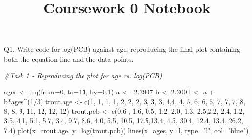 \documentclass[
]{article}
\title{Coursework 0 Notebook}
\author{}
\date{\vspace{-2.5em}}
\newenvironment{Shaded}{\begin{snugshade}}{\end{snugshade}}
\newcommand{\AttributeTok}[1]{\textcolor[rgb]{0.77,0.63,0.00}{#1}}
\newcommand{\CommentTok}[1]{\textcolor[rgb]{0.56,0.35,0.01}{\textit{#1}}}
\newcommand{\DecValTok}[1]{\textcolor[rgb]{0.00,0.00,0.81}{#1}}
\newcommand{\FloatTok}[1]{\textcolor[rgb]{0.00,0.00,0.81}{#1}}
\newcommand{\FunctionTok}[1]{\textcolor[rgb]{0.00,0.00,0.00}{#1}}
\newcommand{\NormalTok}[1]{#1}
\newcommand{\OtherTok}[1]{\textcolor[rgb]{0.56,0.35,0.01}{#1}}
\newcommand{\SpecialCharTok}[1]{\textcolor[rgb]{0.00,0.00,0.00}{#1}}
\newcommand{\StringTok}[1]{\textcolor[rgb]{0.31,0.60,0.02}{#1}}
\begin{document}
\maketitle

Q1. Write code for log(PCB) against age, reproducing the final plot
containing both the equation line and the data points.

\begin{Shaded}
\begin{Highlighting}[]
\CommentTok{\#Task 1 {-} Reproducing the plot for age vs. log(PCB)}


\NormalTok{ages }\OtherTok{\textless{}{-}} \FunctionTok{seq}\NormalTok{(}\AttributeTok{from=}\DecValTok{0}\NormalTok{, }\AttributeTok{to=}\DecValTok{13}\NormalTok{, }\AttributeTok{by=}\FloatTok{0.1}\NormalTok{)}
\NormalTok{a }\OtherTok{\textless{}{-}} \SpecialCharTok{{-}}\FloatTok{2.3907}
\NormalTok{b }\OtherTok{\textless{}{-}} \FloatTok{2.300}
\NormalTok{l }\OtherTok{\textless{}{-}}\NormalTok{ a }\SpecialCharTok{+}\NormalTok{ b}\SpecialCharTok{*}\NormalTok{ages}\SpecialCharTok{\^{}}\NormalTok{(}\DecValTok{1}\SpecialCharTok{/}\DecValTok{3}\NormalTok{)}
\NormalTok{trout.age }\OtherTok{\textless{}{-}} \FunctionTok{c}\NormalTok{(}\DecValTok{1}\NormalTok{, }\DecValTok{1}\NormalTok{, }\DecValTok{1}\NormalTok{, }\DecValTok{1}\NormalTok{, }\DecValTok{2}\NormalTok{, }\DecValTok{2}\NormalTok{, }\DecValTok{2}\NormalTok{, }\DecValTok{3}\NormalTok{, }\DecValTok{3}\NormalTok{, }\DecValTok{3}\NormalTok{, }\DecValTok{4}\NormalTok{,}\DecValTok{4}\NormalTok{, }\DecValTok{4}\NormalTok{, }\DecValTok{5}\NormalTok{, }\DecValTok{6}\NormalTok{, }\DecValTok{6}\NormalTok{, }\DecValTok{6}\NormalTok{, }\DecValTok{7}\NormalTok{, }\DecValTok{7}\NormalTok{, }\DecValTok{7}\NormalTok{, }\DecValTok{8}\NormalTok{, }\DecValTok{8}\NormalTok{,}
               \DecValTok{8}\NormalTok{, }\DecValTok{9}\NormalTok{, }\DecValTok{11}\NormalTok{, }\DecValTok{12}\NormalTok{, }\DecValTok{12}\NormalTok{, }\DecValTok{12}\NormalTok{)}
\NormalTok{trout.pcb }\OtherTok{\textless{}{-}} \FunctionTok{c}\NormalTok{(}\FloatTok{0.6}\NormalTok{ , }\FloatTok{1.6}\NormalTok{, }\FloatTok{0.5}\NormalTok{, }\FloatTok{1.2}\NormalTok{, }\FloatTok{2.0}\NormalTok{, }\FloatTok{1.3}\NormalTok{, }\FloatTok{2.5}\NormalTok{,}\FloatTok{2.2}\NormalTok{, }\FloatTok{2.4}\NormalTok{, }\FloatTok{1.2}\NormalTok{, }\FloatTok{3.5}\NormalTok{, }\FloatTok{4.1}\NormalTok{, }\FloatTok{5.1}\NormalTok{, }\FloatTok{5.7}\NormalTok{,}
               \FloatTok{3.4}\NormalTok{, }\FloatTok{9.7}\NormalTok{, }\FloatTok{8.6}\NormalTok{, }\FloatTok{4.0}\NormalTok{, }\FloatTok{5.5}\NormalTok{, }\FloatTok{10.5}\NormalTok{, }\FloatTok{17.5}\NormalTok{,}\FloatTok{13.4}\NormalTok{, }\FloatTok{4.5}\NormalTok{, }\FloatTok{30.4}\NormalTok{, }\FloatTok{12.4}\NormalTok{, }\FloatTok{13.4}\NormalTok{, }\FloatTok{26.2}\NormalTok{, }\FloatTok{7.4}\NormalTok{)}
\FunctionTok{plot}\NormalTok{(}\AttributeTok{x=}\NormalTok{trout.age, }\AttributeTok{y=}\FunctionTok{log}\NormalTok{(trout.pcb))}
\FunctionTok{lines}\NormalTok{(}\AttributeTok{x=}\NormalTok{ages, }\AttributeTok{y=}\NormalTok{l, }\AttributeTok{type=}\StringTok{"l"}\NormalTok{, }\AttributeTok{col=}\StringTok{"blue"}\NormalTok{)}
\end{Highlighting}
\end{Shaded}
\end{document}

